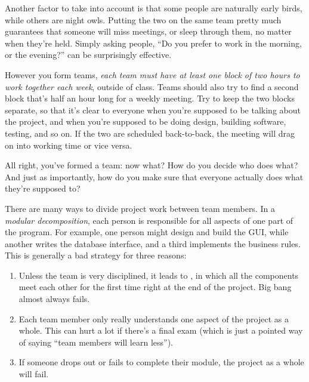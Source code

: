 \documentclass{report}
\begin{document}
Another factor to take into account is that some people are naturally
early birds, while others are night owls.  Putting the two on the same
team pretty much guarantees that someone will miss meetings, or sleep
through them, no matter when they're held.  Simply asking people, ``Do
you prefer to work in the morning, or the evening?'' can be
surprisingly effective.

However you form teams, \emph{each team must have at least one block
of two hours to work together each week}, outside of class.  Teams
should also try to find a second block that's half an hour long for a
weekly meeting.  Try to keep the two blocks separate, so that it's
clear to everyone when you're supposed to be talking about the
project, and when you're supposed to be doing design, building
software, testing, and so on.  If the two are scheduled back-to-back,
the meeting will drag on into working time or vice versa.


All right, you've formed a team: now what?  How do you decide who does
what?  And just as importantly, how do you make sure that everyone
actually does what they're supposed to?

There are many ways to divide project work between team members.  In a
\emph{modular decomposition}, each person is responsible for all
aspects of one part of the program.  For example, one person might
design and build the GUI, while another writes the database interface,
and a third implements the business rules.  This is generally a bad
strategy for three reasons:

\begin{enumerate}

  \item Unless the team is very disciplined, it leads to , in which all the components meet each other for
  the first time right at the end of the project.  Big bang almost
  always fails.

  \item Each team member only really understands one aspect of the
  project as a whole.  This can hurt a lot if there's a final exam
  (which is just a pointed way of saying ``team members will learn
  less'').

  \item If someone drops out or fails to complete their module, the
  project as a whole will fail.

\end{enumerate}
\end{document}
